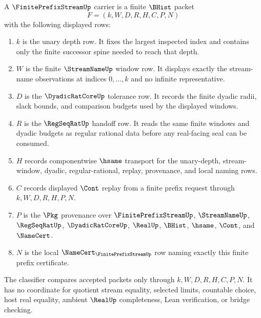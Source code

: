 \begin{definition}
\label{def:finite-prefix-stream-certificate-carrier}
A $\FinitePrefixStreamUp$ carrier is a finite $\BHist$ packet
$$
F=(k,W,D,R,H,C,P,N)
$$
with the following displayed rows:
\begin{enumerate}
\item $k$ is the unary depth row. It fixes the largest inspected index and contains only the finite successor spine needed to reach that depth.
\item $W$ is the finite $\StreamNameUp$ window row. It displays exactly the stream-name observations at indices $0,\ldots,k$ and no infinite representative.
\item $D$ is the $\DyadicRatCoreUp$ tolerance row. It records the finite dyadic radii, slack bounds, and comparison budgets used by the displayed windows.
\item $R$ is the $\RegSeqRatUp$ handoff row. It reads the same finite windows and dyadic budgets as regular rational data before any real-facing seal can be consumed.
\item $H$ records componentwise $\hsame$ transport for the unary-depth, stream-window, dyadic, regular-rational, replay, provenance, and local naming rows.
\item $C$ records displayed $\Cont$ replay from a finite prefix request through $k,W,D,R,H,P,N$.
\item $P$ is the $\Pkg$ provenance over $\FinitePrefixStreamUp$, $\StreamNameUp$, $\RegSeqRatUp$, $\DyadicRatCoreUp$, $\RealUp$, $\BHist$, $\hsame$, $\Cont$, and $\NameCert$.
\item $N$ is the local $\NameCert_{\FinitePrefixStreamUp}$ row naming exactly this finite prefix certificate.
\end{enumerate}
The classifier compares accepted packets only through $k,W,D,R,H,C,P,N$. It has no coordinate for quotient stream equality, selected limits, countable choice, host real equality, ambient $\RealUp$ completeness, Lean verification, or bridge checking.
\end{definition}

